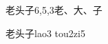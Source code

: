 \begin{entry}{老头子}{6,5,3}{⽼、⼤、⼦}
  \begin{phonetics}{老头子}{lao3 tou2zi5}
  \end{phonetics}
\end{entry}
